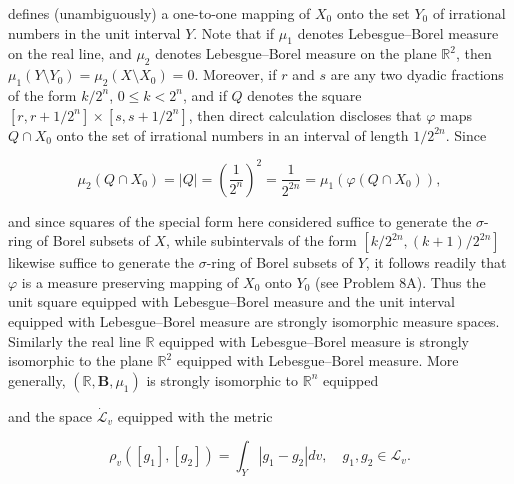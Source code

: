 defines (unambiguously) a one-to-one mapping of $X_0$ onto the set $Y_0$ of irrational numbers in the unit interval $Y$. Note that if $\mu_1$ denotes Lebesgue–Borel measure on the real line, and $\mu_2$ denotes Lebesgue–Borel measure on the plane $\mathbb{R}^2$, then $\mu_1(Y \setminus Y_0) = \mu_2(X \setminus X_0) = 0$. Moreover, if $r$ and $s$ are any two dyadic fractions of the form $k/2^n$, $0 \leq k < 2^n$, and if $Q$ denotes the square $[r, r + 1/2^n] \times [s, s + 1/2^n]$, then direct calculation discloses that $\varphi$ maps $Q \cap X_0$ onto the set of irrational numbers in an interval of length $1/2^{2n}$. Since

$$\mu_2(Q \cap X_0) = |Q| = \left(\frac{1}{2^n}\right)^2 = \frac{1}{2^{2n}} = \mu_1(\varphi(Q \cap X_0)),$$

and since squares of the special form here considered suffice to generate the $\sigma$-ring of Borel subsets of $X$, while subintervals of the form $[k/2^{2n}, (k + 1)/2^{2n}]$ likewise suffice to generate the $\sigma$-ring of Borel subsets of $Y$, it follows readily that $\varphi$ is a measure preserving mapping of $X_0$ onto $Y_0$ (see Problem 8A). Thus the unit square equipped with Lebesgue–Borel measure and the unit interval equipped with Lebesgue–Borel measure are strongly isomorphic measure spaces. Similarly the real line $\mathbb{R}$ equipped with Lebesgue–Borel measure is strongly isomorphic to the plane $\mathbb{R}^2$ equipped with Lebesgue–Borel measure. More generally, $(\mathbb{R}, \mathbf{B}, \mu_1)$ is strongly isomorphic to $\mathbb{R}^n$ equipped

and the space $\dot{\mathcal{L}}_v$ equipped with the metric

$$\rho_v([g_1], [g_2]) = \int_Y |g_1 - g_2| dv, \quad g_1, g_2 \in \mathcal{L}_v.$$
